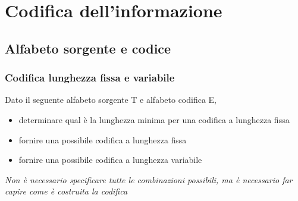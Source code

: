 \documentclass[11pt,fleqn]{book}
\begin{document}

\part{Codifica dell'informazione}



\chapter{Alfabeto sorgente e codice}

\newpage

\section{Codifica lunghezza fissa e variabile}

Dato il seguente alfabeto sorgente T e alfabeto codifica E,
\begin{itemize}
    \item determinare qual è la lunghezza minima per una codifica a lunghezza fissa
    \item fornire una possibile codifica a lunghezza fissa 
    \item fornire una possibile codifica a lunghezza variabile
\end{itemize}
\emph{Non è necessario specificare tutte le combinazioni possibili, ma è necessario far capire come è costruita la codifica}
\end{document}
